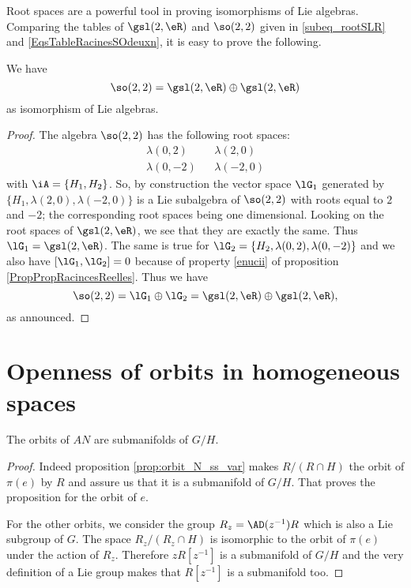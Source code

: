 Root spaces are a powerful tool in proving isomorphisms of Lie algebras. Comparing the tables of $\gsl(2,\eR)$ and $\so(2,2)$ given in \ref{subeq_rootSLR} and \ref{EqsTableRacinesSOdeuxn}, it is easy to prove the following.

\begin{proposition}
We have
\begin{equation}
	\so(2,2)=\gsl(2,\eR)\oplus\gsl(2,\eR)
\end{equation}
as isomorphism of Lie algebras.
\end{proposition}

\begin{proof}
The algebra $\so(2,2)$ has the following root spaces:
\begin{align*}
\lambda(0,2)&&\lambda(2,0)\\
\lambda(0,-2)&&\lambda(-2,0)
\end{align*}
with $\iA=\{ H_1,H_2 \}$. So, by construction the vector space $\lG_1$ generated by $\{ H_1,\lambda(2,0),\lambda(-2,0) \}$ is a Lie subalgebra of $\so(2,2)$ with roots equal to $2$ and $-2$; the corresponding root spaces being one dimensional. Looking on the root spaces of $\gsl(2,\eR)$, we see that they are exactly the same. Thus $\lG_1=\gsl(2,\eR)$. The same is true for $\lG_2=\{ H_2,\lambda(0,2),\lambda(0,-2)  \}$ and we also have $[\lG_1,\lG_2]=0$ because of property \ref{enucii} of proposition \ref{PropPropRacincesReelles}. Thus we have
\[ 
	\so(2,2)=\lG_1\oplus\lG_2=\gsl(2,\eR)\oplus\gsl(2,\eR),
\]
as announced.
\end{proof}

\section{Openness of orbits in homogeneous spaces}
\label{SecDNqdJOp}

\begin{proposition} \label{pg:orbit_ssvar}
The orbits of $AN$ are submanifolds of $G/H$.
\end{proposition}

\begin{proof}
 Indeed proposition \ref{prop:orbit_N_ss_var} makes $R/(R\cap H)$ the orbit of $\pi(e)$ by $R$ and assure us that it is a submanifold of $G/H$. That proves the proposition for the orbit of $e$. 

For the other orbits, we consider the group $R_z=\AD(z^{-1})R$ which is also a Lie  subgroup of $G$. The space $R_z/(R_z\cap H)$ is isomorphic to the orbit of $\pi(e)$ under the action of $R_z$. Therefore $zR[z^{-1}]$ is a submanifold of $G/H$ and the very definition of a Lie group makes that  $R[z^{-1}]$ is a submanifold too.

\end{proof}

